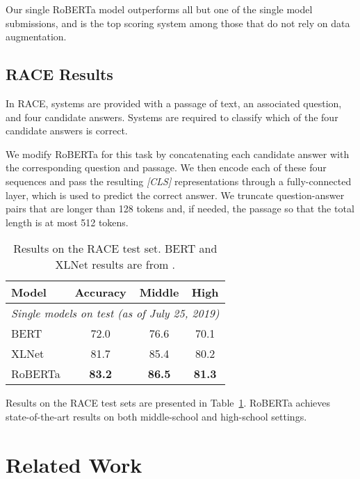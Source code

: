 \documentclass[11pt]{article}
\newcommand{\ourmodel}{RoBERTa}
\newcommand{\bertlarge}{BERT}
\newcommand{\xlnetlarge}{XLNet}
\begin{document}
Our single \ourmodel{} model outperforms all but one of the single model submissions, and is the top scoring system among those that do not rely on data augmentation.

\subsection{RACE Results} \label{sec:results_race}

In RACE, systems are provided with a passage of text, an associated question, and four candidate answers. Systems are required to classify which of the four candidate answers is correct.

We modify \ourmodel{} for this task by concatenating each candidate answer with the corresponding question and passage.
We then encode each of these four sequences and pass the resulting \emph{[CLS]} representations through a fully-connected layer, which is used to predict the correct answer.
We truncate question-answer pairs that are longer than 128 tokens and, if needed, the passage so that the total length is at most 512 tokens.


\begin{table}[t]
\begin{center}
\begin{tabular}{lccc}
\toprule
\bf Model & \bf Accuracy & \bf Middle & \bf High \\
\midrule
\multicolumn{4}{l}{\textit{Single models on test (as of July 25, 2019)}}\\
\bertlarge{} &  72.0 & 76.6 & 70.1 \\
\xlnetlarge{} & 81.7 & 85.4 & 80.2 \\
\midrule
\ourmodel{} & \bf{83.2} &  \bf{86.5} & \bf{81.3}\\
\bottomrule
\end{tabular}
\end{center}
\caption{Results on the RACE test set. BERT and XLNet results are from .}
\label{tab:roberta_race}
\end{table}
 
Results on the RACE test sets are presented in Table~\ref{tab:roberta_race}.
\ourmodel{} achieves state-of-the-art results on both middle-school and high-school settings.


 \section{Related Work} \label{sec:relwork}
\end{document}

